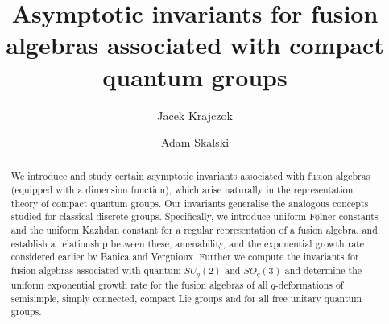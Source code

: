 \documentclass[11 pt, leqno]{amsart}
\theoremstyle{definition}
\numberwithin{equation}{section}
\begin{document}
		
\renewcommand{\arraystretch}{2}
		
\author{Jacek Krajczok}
\address{Vrije Universiteit Brussel, Pleinlaan 2, 1050 Brussels, Belgium}
		
		
\author{Adam Skalski}
\address{Institute of Mathematics of the Polish Academy of Sciences, ul. \'Sniadeckich 8, 00-656 Warszawa, Poland}
	




\title[Asymptotic invariants of quantum fusion algebras]{\bf Asymptotic invariants for fusion algebras associated with compact quantum groups}

\begin{abstract}
We introduce and study certain asymptotic invariants associated with fusion algebras (equipped with a dimension function), which arise naturally in the representation theory of compact quantum groups. Our invariants generalise the analogous concepts studied for classical discrete groups. Specifically, we introduce uniform F\o lner constants and the uniform Kazhdan constant for a regular representation of a fusion algebra, and establish a relationship between these, amenability, and the exponential growth rate considered earlier by Banica and Vergnioux. Further we compute the invariants for fusion algebras associated with 
quantum $SU_q(2)$ and $SO_q(3)$ and determine the uniform exponential growth rate for the fusion algebras of all $q$-deformations of semisimple, simply connected, compact Lie groups and for all free unitary quantum groups.
\end{abstract}


\maketitle
\end{document}
